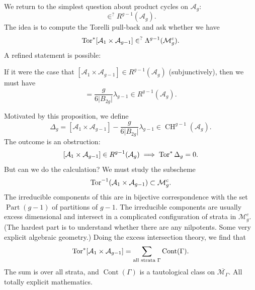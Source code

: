 \documentclass[reqno]{amsart} 
\begin{document}
We return to the simplest question about product cycles on $\mathcal{A}_g$:
\begin{equation*}
  [\mathcal{A}_1 \times \mathcal{A}_{g - 1}] \in^{?} R^{g - 1}(\mathcal{A}_g).
\end{equation*}
The idea is to compute the Torelli pull-back and ask whether we have
\begin{equation*}
  \operatorname{Tor}^\ast[\mathcal{A}_1 \times \mathcal{A}_{g - 1} ] \in^{?}
  \Lambda^{g - 1}(\mathcal{M}_g^{c}).
\end{equation*}
A refined statement is possible:
\begin{proposition} If it were the case that $[\mathcal{A}_1 \times \mathcal{A}_{g - 1}] \in R^{g - 1}(\mathcal{A}_g)$ (subjunctively), then we must have
  \begin{equation*}
    [\mathcal{A}_1 \times \mathcal{A}_{g - 1}] = \frac{g}{6 \lvert B_{2 g} \rvert}
    \lambda_{g - 1} \in R^{g - 1}(\mathcal{A}_g).
  \end{equation*}
\end{proposition}

Motivated by this proposition, we define
\begin{equation*}
  \Delta_g =[\mathcal{A}_1 \times \mathcal{A}_{g - 1}]
  - \frac{g}{6 \lvert B_{2 g} \rvert} \lambda_{g - 1}
  \in \operatorname{CH}^{g - 1}(\mathcal{A}_g).
\end{equation*}
The outcome is an obstruction:
\begin{equation}\label{eq:cnpo5ealj6}
  [\mathcal{A}_1 \times \mathcal{A}_{g - 1}] \in R^{g - 1}(\mathcal{A}_g)
  \implies \operatorname{Tor}^\ast \Delta_g = 0.
\end{equation}
But can we do the calculation?  We must study the subscheme
\begin{equation*}
  \operatorname{Tor}^{-1}(\mathcal{A}_1 \times \mathcal{A}_{g - 1}) \subset \mathcal{M}_g^c.
\end{equation*}
The irreducible components of this are in bijective correspondence with the set $\operatorname{Part}(g - 1)$ of partitions of $g - 1$.  The irreducible components are usually excess dimensional and intersect in a complicated configuration of strata in $\mathcal{M}_{g}^{c}$.  (The hardest part is to understand whether there are any nilpotents.  Some very explicit algebraic geometry.)  Doing the excess intersection theory, we find that
\begin{equation*}
  \operatorname{Tor}^\ast[\mathcal{A}_1 \times \mathcal{A}_{g - 1}] = \sum_{\text{all strata } \Gamma} \operatorname{Cont}(\Gamma).
\end{equation*}
The sum is over all strata, and $\operatorname{Cont}(\Gamma)$ is a tautological class on $\overline{\mathcal{M}_{\Gamma}}$.  All totally explicit mathematics.
\end{document}
